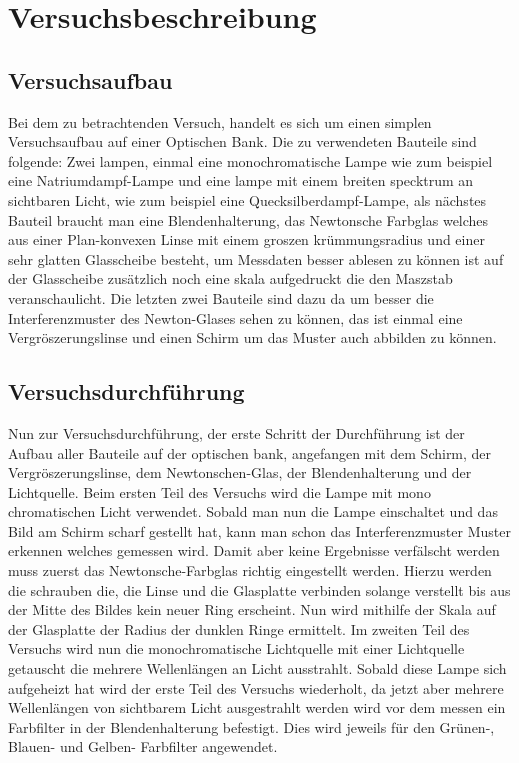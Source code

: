 \section{Versuchsbeschreibung}
\subsection{Versuchsaufbau}

Bei dem zu betrachtenden Versuch, handelt es sich um einen simplen Versuchsaufbau auf einer 
Optischen Bank. Die zu verwendeten Bauteile sind folgende: Zwei lampen, einmal eine 
monochromatische Lampe wie zum beispiel eine Natriumdampf-Lampe und eine lampe mit einem 
breiten specktrum an sichtbaren Licht, wie zum beispiel eine Quecksilberdampf-Lampe, als 
nächstes Bauteil braucht man eine Blendenhalterung, das Newtonsche Farbglas welches aus 
einer Plan-konvexen Linse mit einem groszen krümmungsradius und einer sehr glatten 
Glasscheibe besteht, um Messdaten besser ablesen zu können ist auf der Glasscheibe zusätzlich 
noch eine skala aufgedruckt die den Maszstab veranschaulicht. Die letzten zwei Bauteile sind 
dazu da um besser die Interferenzmuster des Newton-Glases sehen zu können, das ist einmal 
eine Vergröszerungslinse und einen Schirm um das Muster auch abbilden zu können. %


\subsection{Versuchsdurchführung}

Nun zur Versuchsdurchführung, der erste Schritt der Durchführung ist der Aufbau aller 
Bauteile auf der optischen bank, angefangen mit dem Schirm, der Vergröszerungslinse, dem 
Newtonschen-Glas, der Blendenhalterung und der Lichtquelle. Beim ersten Teil des Versuchs 
wird die Lampe mit mono chromatischen Licht verwendet. Sobald man nun die Lampe einschaltet 
und das Bild am Schirm scharf gestellt hat, kann man schon das Interferenzmuster Muster 
erkennen welches gemessen wird. Damit aber keine Ergebnisse verfälscht werden muss zuerst 
das Newtonsche-Farbglas richtig eingestellt werden. Hierzu werden die schrauben die, die 
Linse und die Glasplatte verbinden solange verstellt bis aus der Mitte des Bildes kein 
neuer Ring erscheint. Nun wird mithilfe der Skala auf der Glasplatte der Radius der dunklen 
Ringe ermittelt. Im zweiten Teil des Versuchs wird nun die monochromatische Lichtquelle mit 
einer Lichtquelle getauscht die mehrere Wellenlängen an Licht ausstrahlt. Sobald diese 
Lampe sich aufgeheizt hat wird der erste Teil des Versuchs wiederholt, da jetzt aber 
mehrere Wellenlängen von sichtbarem Licht ausgestrahlt werden wird vor dem messen ein 
Farbfilter in der Blendenhalterung befestigt. Dies wird jeweils für den Grünen-, Blauen- 
und Gelben- Farbfilter angewendet. 